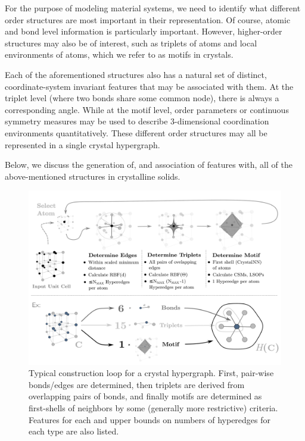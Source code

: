 \documentclass[twoside,twocolumn,9pt]{article}
\begin{document}
For the purpose of modeling material systems, we need to identify what different order structures are most important in their representation. Of course, atomic and bond level information is particularly important. However, higher-order structures may also be of interest, such as triplets of atoms and local environments of atoms, which we refer to as motifs in crystals.

Each of the aforementioned structures also has a natural set of distinct, coordinate-system invariant features that may be associated with them. At the triplet level (where two bonds share some common node), there is always a corresponding angle. While at the motif level, order parameters \cite{orderparam1, orderparam2} or continuous symmetry measures \cite{csm_polyhedra, chemenv} may be used to describe 3-dimensional coordination environments quantitatively. 
These different order structures may all be represented in a single crystal hypergraph. 



Below, we discuss the generation of, and association of features with, all of the above-mentioned structures in crystalline solids. 

\begin{figure}[!ht]
	\centering
	\includegraphics[scale=0.31]{crystal_hgraph_ex+revamp3.pdf}
	\caption{Typical construction loop for a crystal hypergraph. First, pair-wise bonds/edges are determined, then triplets are derived from overlapping pairs of bonds, and finally motifs are determined as first-shells of neighbors by some (generally more restrictive) criteria. Features for each and upper bounds on numbers of hyperedges for each type are also listed.}
	\label{fig:hypergraph-loop}
\end{figure}
\end{document}
